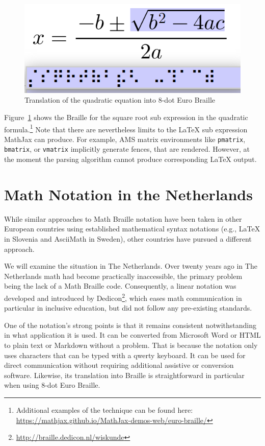\documentclass{article}
\begin{document}
\begin{figure}
  \includegraphics[width=.6\textwidth]{quadratic-square.png}
  \caption{Translation of the quadratic equation into 8-dot Euro Braille}
  \label{fig:subbraille}
\end{figure}

Figure~\ref{fig:subbraille} shows the Braille for the square root sub expression
in the quadratic formula.\footnote{Additional examples of the technique can be found
here: \url{https://mathjax.github.io/MathJax-demos-web/euro-braille/}} Note that
there are nevertheless limits to the {\LaTeX} sub expression MathJax can
produce. For example, AMS matrix environments like \texttt{pmatrix},
\texttt{bmatrix}, or \texttt{vmatrix} implicitly generate fences, that are
rendered. However, at the moment the parsing algorithm cannot produce
corresponding {\LaTeX} output.

\section{Math Notation in the Netherlands}\label{sec:math-netherlands}

While similar approaches to Math Braille notation have been taken in other
European countries using established mathematical syntax notations (e.g.,
{\LaTeX} in Slovenia and AsciiMath in Sweden), other countries have pursued a
different approach.

We will examine the situation in The Netherlands. Over twenty years ago in The
Netherlands math had become practically inaccessible, the primary problem being
the lack of a Math Braille code. Consequently, a linear notation was developed
and introduced by Dedicon\footnote{\url{http://braille.dedicon.nl/wiskunde}}, which eases
math communication in particular in inclusive education, but did not follow any
pre-existing standards.

One of the notation's strong points is that it remains consistent
notwithstanding in what application it is used. It can be converted from
Microsoft Word or HTML to plain text or Markdown without a problem. That is
because the notation only uses characters that can be typed with a qwerty
keyboard. It can be used for direct communication without requiring additional
assistive or conversion software. Likewise, its translation into Braille is
straightforward in particular when using 8-dot Euro Braille.
\end{document}
